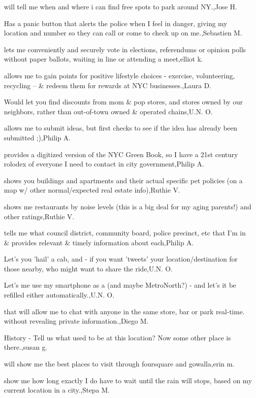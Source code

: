 \documentclass{article}
\begin{document}
will tell me when and where i can find free spots to park around NY.,Jose H.

Has a panic button that alerts the police when I feel in danger, giving my location and number so they can call or come to check up on me.,Sebastien M.

lets me conveniently and securely vote in elections, referendums or opinion polls without paper ballots, waiting in line or attending a meet,elliot k.

allows me to gain points for positive lifestyle choices - exercise, volunteering, recycling --  \& redeem them for rewards at NYC businesses.,Laura D.

Would let you find discounts from mom \& pop stores, and stores owned by our neighbors, rather than out-of-town owned \& operated chains,U.N. O.

allows me to submit ideas, but first checks to see if the idea has already been submitted ;),Philip A.

provides a digitized version of the NYC Green Book, so I have a 21st century rolodex of everyone I need to contact in city government,Philip A.

shows you buildings and apartments and their actual specific pet policies (on a map w/ other normal/expected real estate info),Ruthie V.

shows me restaurants by noise levels (this is a big deal for my aging parents!) and other ratings,Ruthie V.

tells me what council district, community board, police precinct, etc that I'm in \& provides relevant \& timely information about each,Philip A.

Let's you 'hail' a cab, and - if you want 'tweets' your location/destination for those nearby, who might want to share the ride,U.N. O.

Let's me use my smartphone as a  (and maybe MetroNorth?) - and let's it be refilled either automatically.,U.N. O.

that will allow me to chat with anyone in the same store, bar or park real-time. without revealing private information.,Diego M.

History - Tell us what used to be at this location? Now some other place is there.,susan g.

will show me the best places to visit through foursquare and gowalla,erin m.

show me how long exactly I do have to wait until the rain will stops, based on my current location in a city.,Stepa M.
\end{document}
